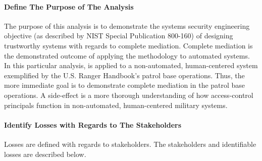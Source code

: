 \documentclass[../../main/main.tex]{subfiles}
\begin{document}
\paragraph*{Define The Purpose of The Analysis}
The purpose of this analysis is to demonstrate the systems security engineering objective (as described by NIST Special Publication 800-160) of designing trustworthy systems with regards to complete mediation.  Complete mediation is the demonstrated outcome of applying the  methodology to automated systems.  In this particular analysis,  is applied to a non-automated, human-centered system exemplified by the U.S. Ranger Handbook's patrol base operations.  Thus, the more immediate goal is to demonstrate complete mediation in the patrol base operations.  A side-effect is a more thorough understanding of how access-control principals function in non-automated, human-centered military systems.  

\paragraph*{Identify Losses  with Regards to The Stakeholders}
Losses are defined with regards to stakeholders.  The stakeholders and identifiable losses are described below.
\end{document}
